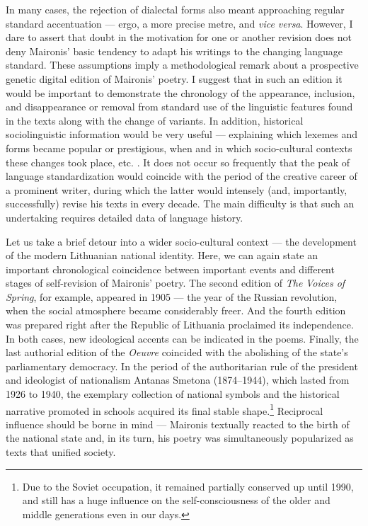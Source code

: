 \begin{paper}
In many cases, the rejection of dialectal forms also meant approaching
regular standard accentuation --- ergo, a more precise metre, and
\emph{vice versa}. However, I dare to assert that doubt in the
motivation for one or another revision does not deny Maironis' basic tendency
to adapt his writings to the changing language standard. These assumptions imply a
methodological remark about a prospective genetic digital edition of
Maironis' poetry. I suggest that in such an edition it would be important
to demonstrate the chronology of the appearance, inclusion, and
disappearance or removal from standard use of the linguistic features
found in the texts along with the change of variants. In addition,
historical sociolinguistic information would be very useful --- explaining which
lexemes and forms became popular or prestigious, when and in which socio-cultural
contexts these changes took place, etc. \citep[cf.][230]{venckiene_maironio_2018}. It does not occur so
frequently that the peak of language standardization would 
coincide with the period of the creative career of a prominent writer,
during which the latter would intensely (and, importantly,
successfully) revise his texts in every decade. The main difficulty is
that such an undertaking requires detailed data of language history.

Let us take a brief detour into a wider socio-cultural context --- the
development of the modern Lithuanian national identity. Here, we can again
state an important chronological coincidence between important events and different stages of
self-revision of Maironis' poetry. The second edition of \emph{The}
\emph{Voices of Spring}, for example, appeared in 1905 --- the year of the Russian revolution, when the social atmosphere became considerably freer. And the fourth
edition was prepared right after the
Republic of Lithuania proclaimed its independence. In both cases, new ideological accents can be indicated in the
poems. Finally, the last authorial edition of the
\emph{Oeuvre} coincided with the abolishing of the state's parliamentary democracy.
In the period of the authoritarian rule of the president and ideologist
of nationalism Antanas Smetona (1874--1944), which lasted from 1926 to
1940, the exemplary collection of national symbols and the historical
narrative promoted in schools acquired its final stable shape.\footnote{Due to
the Soviet occupation, it remained partially conserved up until 1990,
and still has a huge influence on the self-consciousness of the older
and middle generations even in our days.} Reciprocal influence should be
borne in mind --- Maironis textually reacted to the birth of the
national state and, in its turn, his poetry was simultaneously
popularized as texts that unified society.


\end{paper}
